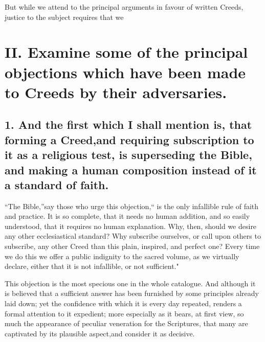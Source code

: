 \documentclass[
]{book}
\begin{document}
But while we attend to the principal arguments in favour of written Creeds, justice to the subject requires that we

\hypertarget{ii.-examine-some-of-the-principal-objections-which-have-been-made-to-creeds-by-their-adversaries.}{%
\section{II. Examine some of the principal objections which have been made to Creeds by their adversaries.}\label{ii.-examine-some-of-the-principal-objections-which-have-been-made-to-creeds-by-their-adversaries.}}

\hypertarget{and-the-first-which-i-shall-mention-is-that-forming-a-creedand-requiring-subscription-to-it-as-a-religious-test-is-superseding-the-bible-and-making-a-human-composition-instead-of-it-a-standard-of-faith.}{%
\subsection{1. And the first which I shall mention is, that forming a Creed,and requiring subscription to it as a religious test, is superseding the Bible, and making a human composition instead of it a standard of faith.}\label{and-the-first-which-i-shall-mention-is-that-forming-a-creedand-requiring-subscription-to-it-as-a-religious-test-is-superseding-the-bible-and-making-a-human-composition-instead-of-it-a-standard-of-faith.}}

``The Bible,''say those who urge this objection,`` is the only infallible rule of faith and practice. It is so complete, that it needs no human addition, and so easily understood, that it requires no human explanation. Why, then, should we desire any other ecclesiastical standard? Why subscribe ourselves, or call upon others to subscribe, any other Creed than this plain, inspired, and perfect one? Every time we do this we offer a public indignity to the sacred volume, as we virtually declare, either that it is not infallible, or not sufficient."

This objection is the most specious one in the whole catalogue. And although it is believed that a sufficient answer has been furnished by some principles already laid down; yet the confidence with which it is every day repeated, renders a formal attention to it expedient; more especially as it bears, at first view, so much the appearance of peculiar veneration for the Scriptures, that many are captivated by its plausible aspect,and consider it as decisive.
\end{document}
